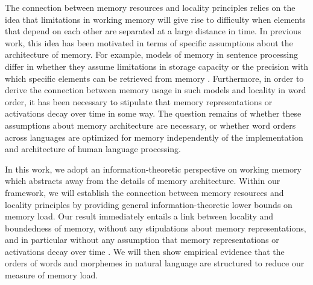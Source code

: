 The connection between memory resources and locality principles relies on the idea that limitations in working memory will give rise to difficulty when elements that depend on each other are separated at a large distance in time. In previous work, this idea has been motivated in terms of specific assumptions about the architecture of memory. For example, models of memory in sentence processing differ in whether they assume limitations in storage capacity \citep{gibson1998linguistic} or the precision with which specific elements can be retrieved from memory \citep{lewis-activation-based-2005}. Furthermore, in order to derive the connection between memory usage in such models and locality in word order, it has been necessary to stipulate that memory representations or activations decay over time in some way. The question remains of whether these assumptions about memory architecture are necessary, or whether word orders across languages are optimized for memory independently of the implementation and architecture of human language processing.

In this work, we adopt an information-theoretic perspective on working memory which abstracts away from the details of memory architecture.
Within our framework, we will establish the connection between memory resources and locality principles by providing general information-theoretic lower bounds on memory load.
Our result immediately entails a link between locality and boundedness of memory, without any stipulations about memory representations, and in particular without any assumption that memory representations or activations decay over time \citep[as was required in][]{gibson1998linguistic, lewis-activation-based-2005, futrell2020lossy}.
We will then show empirical evidence that the orders of words and morphemes in natural language are structured to reduce our measure of memory load.

